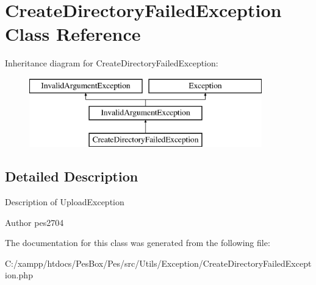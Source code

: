\hypertarget{class_pes_1_1_utils_1_1_exception_1_1_create_directory_failed_exception}{}\section{Create\+Directory\+Failed\+Exception Class Reference}
\label{class_pes_1_1_utils_1_1_exception_1_1_create_directory_failed_exception}
Inheritance diagram for Create\+Directory\+Failed\+Exception\+:\begin{figure}[H]
\begin{center}
\leavevmode
\includegraphics[height=3.000000cm]{class_pes_1_1_utils_1_1_exception_1_1_create_directory_failed_exception}
\end{center}
\end{figure}


\subsection{Detailed Description}
Description of Upload\+Exception

\begin{DoxyAuthor}{Author}
pes2704 
\end{DoxyAuthor}


The documentation for this class was generated from the following file\+:\begin{DoxyCompactItemize}
\item 
C\+:/xampp/htdocs/\+Pes\+Box/\+Pes/src/\+Utils/\+Exception/Create\+Directory\+Failed\+Exception.\+php\end{DoxyCompactItemize}

